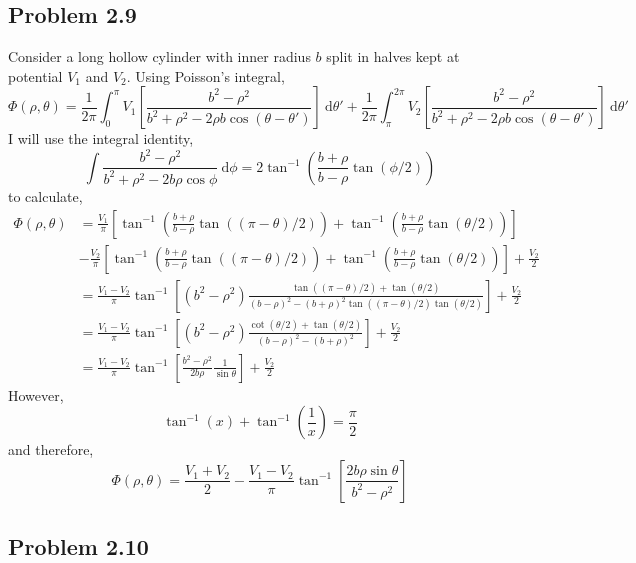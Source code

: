 \documentclass[12pt]{extarticle}
\renewcommand{\d}[1]{\: \mathrm{d}#1}
\theoremstyle{definition}
\begin{document}
\subsection{Problem 2.9}

Consider a long hollow cylinder with inner radius $b$ split in halves kept at potential $V_1$ and $V_2$. Using Poisson's integral,
\[ \Phi(\rho, \theta) = \frac{1}{2 \pi} \int_0^{\pi} V_1  \left[ \frac{b^2 - \rho^2}{b^2 + \rho^2 - 2 \rho b \cos{(\theta - \theta')}}  \right] \d{\theta'} + \frac{1}{2 \pi} \int_{\pi}^{2\pi} V_2  \left[ \frac{b^2 - \rho^2}{b^2 + \rho^2 - 2 \rho b \cos{(\theta - \theta')}}  \right] \d{\theta'} \]
I will use the integral identity,
\[ \int \frac{b^2 - \rho^2}{b^2 + \rho^2 - 2 b \rho \cos{\phi}} \d{\phi} = 2 \tan^{-1}{\left( \frac{b + \rho}{b - \rho} \tan{(\phi/2)} \right)}  \]
to calculate,
\begin{align*}
\Phi(\rho, \theta) & = \frac{V_1}{\pi} \left[ \tan^{-1}{\left( \frac{b + \rho}{b - \rho} \tan{((\pi - \theta)/2)} \right)} + \tan^{-1}{\left( \frac{b + \rho}{b - \rho} \tan{(\theta/2)} \right)} \right]
\\
& - \frac{V_2}{\pi} \left[ \tan^{-1}{\left( \frac{b + \rho}{b - \rho} \tan{((\pi - \theta)/2)} \right)} + \tan^{-1}{\left( \frac{b + \rho}{b - \rho} \tan{(\theta/2)} \right)} \right] + \frac{V_2}{2}
\\
& = \frac{V_1 - V_2}{\pi} \tan^{-1} \left[ (b^2 - \rho^2) \frac{\tan{((\pi - \theta)/2)} + \tan{(\theta/2)}}{(b - \rho)^2 - (b + \rho)^2 \tan{((\pi - \theta)/2)} \tan{(\theta/2)} } \right] + \frac{V_2}{2}
\\
& = \frac{V_1 - V_2}{\pi} \tan^{-1} \left[ (b^2 - \rho^2) \frac{\cot{(\theta/2)} + \tan{(\theta/2)}}{(b - \rho)^2 - (b + \rho)^2} \right] + \frac{V_2}{2}
\\
& = \frac{V_1 - V_2}{\pi} \tan^{-1} \left[ \frac{b^2 - \rho^2}{2 b \rho} \frac{1}{\sin{\theta}} \right] + \frac{V_2}{2}
\end{align*}
However,
\[ \tan^{-1}{(x)} + \tan^{-1}{\left(\frac{1}{x}\right)} = \frac{\pi}{2} \]
and therefore,
\[ \Phi(\rho, \theta) = \frac{V_1 + V_2}{2} - \frac{V_1 - V_2}{\pi} \tan^{-1} \left[ \frac{2 b \rho \sin{\theta}}{b^2 - \rho^2} \right] \]
\subsection{Problem 2.10}
\end{document}
